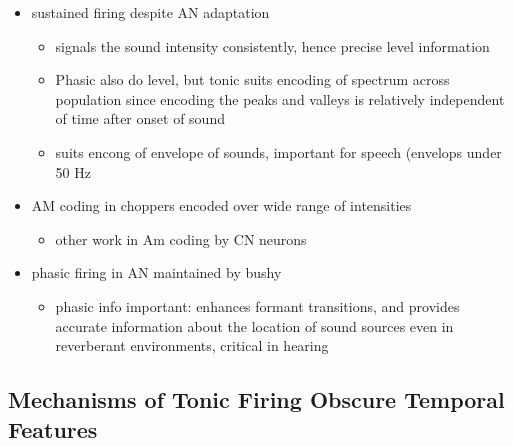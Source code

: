 \begin{itemize}
\item sustained firing despite AN adaptation
\begin{itemize}
\item signals the sound intensity consistently, hence precise level information
\item Phasic also do level, but tonic suits encoding of spectrum across population since encoding the peaks and valleys is relatively independent of time after onset of sound \citep{BlackburnSachs:1990,May:2003,MayPrellEtAl:1998,MaySachs:1998}
\item suits encong of envelope of sounds, important for speech (envelops under 50 Hz \citep{ShannonZengEtAl:1995}
\end{itemize}
\item AM coding in choppers encoded over wide range of intensities \citep{RhodeGreenberg:1994,FrisinaSmithEtAl:1990}
\begin{itemize}
\item other work in Am coding by CN neurons  \citep{Moller:1972,Moller:1974a,Moller:1974,MooreCashin:1974,Frisina:1984,PalmerWinterEtAl:1986,KimRhodeEtAl:1986,WinterPalmer:1990a,Palmer:1990,PalmerWinter:1992,FrisinaSmithEtAl:1990a,Frisina:1983,GorodetskaiaBibikov:1985,RhodeGreenberg:1994,ShofnerSheftEtAl:1996,FrisinaKarcichEtAl:1996,DAngeloSterbingEtAl:2003,Aggarwal:2003}
\end{itemize}
\item phasic firing in AN maintained by bushy
\begin{itemize}
\item phasic info important: enhances formant transitions, and provides accurate information about the location of sound sources even in reverberant environments, critical in hearing \cite{DelgutteKiang:1984,DelgutteKiang:1984a,DelgutteKiang:1984b,DelgutteKiang:1984c,DelgutteKiang:1984d,DavoreIhlefeldEtAl:2009}
\end{itemize}
\end{itemize}


\subsection{Mechanisms of Tonic Firing Obscure Temporal Features}


